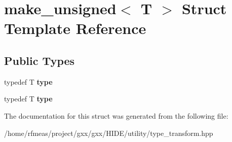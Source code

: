 \hypertarget{structmake__unsigned}{}\section{make\+\_\+unsigned$<$ T $>$ Struct Template Reference}
\label{structmake__unsigned}
\subsection*{Public Types}
\begin{DoxyCompactItemize}
\item 
typedef T {\bfseries type}\hypertarget{structmake__unsigned_ab3987b8feafadbb44673a59eacb61faa}{}\label{structmake__unsigned_ab3987b8feafadbb44673a59eacb61faa}

\item 
typedef T {\bfseries type}\hypertarget{structmake__unsigned_ab3987b8feafadbb44673a59eacb61faa}{}\label{structmake__unsigned_ab3987b8feafadbb44673a59eacb61faa}

\end{DoxyCompactItemize}


The documentation for this struct was generated from the following file\+:\begin{DoxyCompactItemize}
\item 
/home/rfmeas/project/gxx/gxx/\+H\+I\+D\+E/utility/type\+\_\+transform.\+hpp\end{DoxyCompactItemize}
